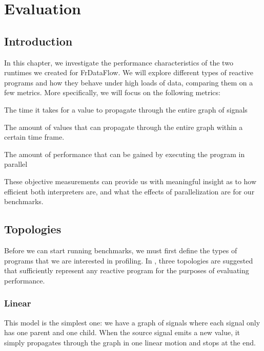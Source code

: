 \chapter{Evaluation}

\section{Introduction}

In this chapter, we investigate the performance characteristics of the two runtimes we created for FrDataFlow. We will explore different types of reactive programs and how they behave under high loads of data, comparing them on a few metrics. More specifically, we will focus on the following metrics:

\begin{description}[style=nextline]
  \item [Latency]		The time it takes for a value to propagate through the entire graph of signals
  \item [Throughput]	The amount of values that can propagate through the entire graph within a certain time frame.
  \item [Scaling]		The amount of performance that can be gained by executing the program in parallel
\end{description}

These objective measurements can provide us with meaningful insight as to how efficient both interpreters are, and what the effects of parallelization are for our benchmarks.

\newpage
\section{Topologies}

Before we can start running benchmarks, we must first define the types of programs that we are interested in profiling. In \cite{drechsler_optimizing_2014}, three topologies are suggested that sufficiently represent any reactive program for the purposes of evaluating performance.

\subsection{Linear}

This model is the simplest one: we have a graph of signals where each signal only has one parent and one child. When the source signal emits a new value, it simply propagates through the graph in one linear motion and stops at the end. 

